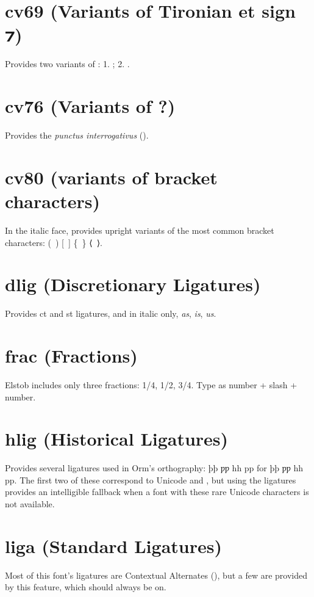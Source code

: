 \documentclass[12pt,letterpaper,openany]{book}
\begin{document}
\section{cv69 (Variants of Tironian et sign ⁊)}
Provides two variants of : 1. ; 2. .

\section{cv76 (Variants of ?)}
Provides the \textit{punctus interrogativus} ().

\section{cv80 (variants of bracket characters)}
In the italic face, provides upright variants of the most common bracket
characters: (\ ) [\ ] \{\ \} ⟨\ ⟩.

\section{dlig (Discretionary Ligatures)}
Provides { ct} and
{ st} ligatures, and in italic only,
{ \textit{as}, \textit{is}, \textit{us}}.

\section{frac (Fractions)}
Elstob includes only three fractions: { 1/4, 1/2,
3/4}. Type as number + slash + number.

\section{hlig (Historical Ligatures)}
Provides several ligatures used in Orm’s orthography:
{ þþ ƿƿ hh pp} for
{þþ ƿƿ hh pp}. The first two of these correspond
to Unicode  and , but using the ligatures provides an intelligible
fallback when a font with these rare Unicode characters is not available.

\section{liga (Standard Ligatures)}
Most of this font’s ligatures are Contextual Alternates (), but a few
are provided by this feature, which should always be on.
\end{document}
